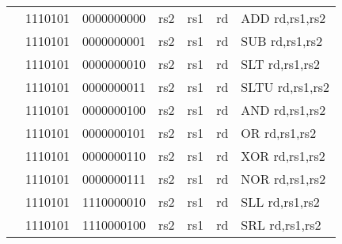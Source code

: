 \begin{table}[p]
\begin{small}
\begin{center}
\begin{tabular}{rcccccccccl}
&
\multicolumn{1}{|c|}{1110101} &
\multicolumn{5}{c|}{0000000000} &
\multicolumn{1}{c|}{rs2} &
\multicolumn{1}{c|}{rs1} &
\multicolumn{1}{c|}{rd} & ADD rd,rs1,rs2 \\
\cline{2-10}
  

&
\multicolumn{1}{|c|}{1110101} &
\multicolumn{5}{c|}{0000000001} &
\multicolumn{1}{c|}{rs2} &
\multicolumn{1}{c|}{rs1} &
\multicolumn{1}{c|}{rd} & SUB rd,rs1,rs2 \\
\cline{2-10}
  

&
\multicolumn{1}{|c|}{1110101} &
\multicolumn{5}{c|}{0000000010} &
\multicolumn{1}{c|}{rs2} &
\multicolumn{1}{c|}{rs1} &
\multicolumn{1}{c|}{rd} & SLT rd,rs1,rs2 \\
\cline{2-10}
  

&
\multicolumn{1}{|c|}{1110101} &
\multicolumn{5}{c|}{0000000011} &
\multicolumn{1}{c|}{rs2} &
\multicolumn{1}{c|}{rs1} &
\multicolumn{1}{c|}{rd} & SLTU rd,rs1,rs2 \\
\cline{2-10}
  

&
\multicolumn{1}{|c|}{1110101} &
\multicolumn{5}{c|}{0000000100} &
\multicolumn{1}{c|}{rs2} &
\multicolumn{1}{c|}{rs1} &
\multicolumn{1}{c|}{rd} & AND rd,rs1,rs2 \\
\cline{2-10}
  

&
\multicolumn{1}{|c|}{1110101} &
\multicolumn{5}{c|}{0000000101} &
\multicolumn{1}{c|}{rs2} &
\multicolumn{1}{c|}{rs1} &
\multicolumn{1}{c|}{rd} & OR rd,rs1,rs2 \\
\cline{2-10}
  

&
\multicolumn{1}{|c|}{1110101} &
\multicolumn{5}{c|}{0000000110} &
\multicolumn{1}{c|}{rs2} &
\multicolumn{1}{c|}{rs1} &
\multicolumn{1}{c|}{rd} & XOR rd,rs1,rs2 \\
\cline{2-10}
  

&
\multicolumn{1}{|c|}{1110101} &
\multicolumn{5}{c|}{0000000111} &
\multicolumn{1}{c|}{rs2} &
\multicolumn{1}{c|}{rs1} &
\multicolumn{1}{c|}{rd} & NOR rd,rs1,rs2 \\
\cline{2-10}
  

&
\multicolumn{1}{|c|}{1110101} &
\multicolumn{5}{c|}{1110000010} &
\multicolumn{1}{c|}{rs2} &
\multicolumn{1}{c|}{rs1} &
\multicolumn{1}{c|}{rd} & SLL rd,rs1,rs2 \\
\cline{2-10}
  

&
\multicolumn{1}{|c|}{1110101} &
\multicolumn{5}{c|}{1110000100} &
\multicolumn{1}{c|}{rs2} &
\multicolumn{1}{c|}{rs1} &
\multicolumn{1}{c|}{rd} & SRL rd,rs1,rs2 \\
\cline{2-10}
  


\end{tabular}
\end{center}
\end{small}
\end{table}
